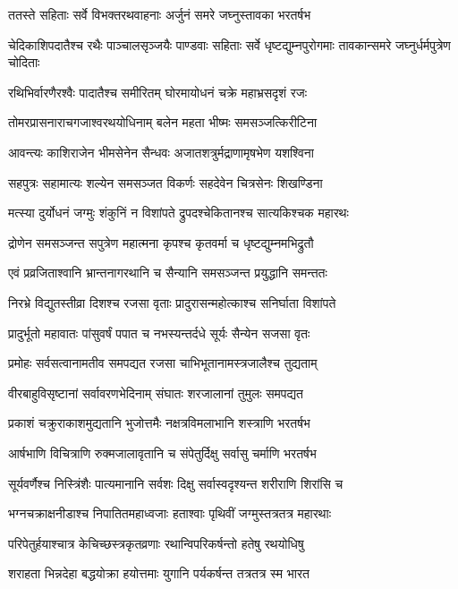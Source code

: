 \twolineshloka
{ततस्ते सहिताः सर्वे विभक्तरथवाहनाः}
{अर्जुनं समरे जघ्नुस्तावका भरतर्षभ}


\threelineshloka
{चेदिकाशिपदातैश्च रथैः पाञ्चालसृञ्जयैः}
{पाण्डवाः सहिताः सर्वे धृष्टद्युम्नपुरोगमाः}
{तावकान्समरे जघ्नुर्धर्मपुत्रेण चोदिताः}


\twolineshloka
{रथिभिर्वारणैरश्वैः पादातैश्च समीरितम्}
{घोरमायोधनं चक्रे महाभ्रसदृशं रजः}


\twolineshloka
{तोमरप्रासनाराचगजाश्वरथयोधिनाम्}
{बलेन महता भीष्मः समसञ्जत्किरीटिना}


\twolineshloka
{आवन्त्यः काशिराजेन भीमसेनेन सैन्धवः}
{अजातशत्रुर्मद्राणामृषभेण यशश्विना}


\twolineshloka
{सहपुत्रः सहामात्यः शल्येन समसञ्जत}
{विकर्णः सहदेवेन चित्रसेनः शिखण्डिना}


\twolineshloka
{मत्स्या दुर्योधनं जग्मुः शंकुनिं न विशांपते}
{द्रुपदश्चेकितानश्च सात्यकिश्चक महारथः}


\twolineshloka
{द्रोणेन समसञ्जन्त सपुत्रेण महात्मना}
{कृपश्च कृतवर्मा च धृष्टद्युम्नमभिद्रुतौ}


\twolineshloka
{एवं प्रव्रजिताश्वानि भ्रान्तनागरथानि च}
{सैन्यानि समसञ्जन्त प्रयुद्धानि समन्ततः}


\twolineshloka
{निरभ्रे विद्युतस्तीव्रा दिशश्च रजसा वृताः}
{प्रादुरासन्महोत्काश्च सनिर्घाता विशांपते}


\twolineshloka
{प्रादुर्भूतो महावातः पांसुवर्षं पपात च}
{नभस्यन्तर्दधे सूर्यः सैन्येन सजसा वृतः}


\twolineshloka
{प्रमोहः सर्वसत्वानामतीव समपद्यत}
{रजसा चाभिभूतानामस्त्रजालैश्च तुद्यताम्}


\twolineshloka
{वीरबाहुविसृष्टानां सर्वावरणभेदिनाम्}
{संघातः शरजालानां तुमुलः समपद्यत}


\twolineshloka
{प्रकाशं चक्रुराकाशमुद्यतानि भुजोत्तमैः}
{नक्षत्रविमलाभानि शस्त्राणि भरतर्षभ}


\twolineshloka
{आर्षभाणि विचित्राणि रुक्मजालावृतानि च}
{संपेतुर्दिक्षु सर्वासु चर्माणि भरतर्षभ}


\threelineshloka
{सूर्यवर्णैश्च निस्त्रिंशैः पात्यमानानि सर्वशः}
{दिक्षु सर्वास्वदृश्यन्त शरीराणि शिरांसि च}
{}


\twolineshloka
{भग्नचक्राक्षनीडाश्च निपातितमहाध्वजाः}
{हताश्वाः पृथिवीं जग्मुस्तत्रतत्र महारथाः}


\twolineshloka
{परिपेतुर्हयाश्चात्र केचिच्छस्त्रकृतव्रणाः}
{रथान्विपरिकर्षन्तो हतेषु रथयोधिषु}


\threelineshloka
{शराहता भिन्नदेहा बद्धयोक्रा हयोत्तमाः}
{युगानि पर्यकर्षन्त तत्रतत्र स्म भारत}
{}


